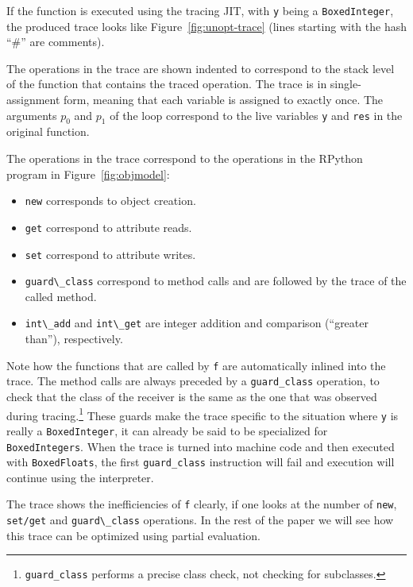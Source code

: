 \documentclass{sigplanconf}
\begin{document}
If the function is executed using the tracing JIT, with \lstinline{y} being a
\lstinline{BoxedInteger}, the produced trace looks like
Figure~\ref{fig:unopt-trace} (lines starting with the hash ``\#'' are comments).

The operations in the trace are shown indented to
correspond to the stack level of the function that contains the traced
operation. The trace is in single-assignment form, meaning that each variable is
assigned to exactly once. The arguments $p_0$ and $p_1$ of the loop correspond
to the live variables \lstinline{y} and \lstinline{res} in the original function.

The operations in the trace correspond to the operations in the RPython program
in Figure~\ref{fig:objmodel}:

\begin{itemize}
    \item \lstinline{new} corresponds to object creation.
    \item \lstinline{get} correspond to attribute reads.
    \item \lstinline{set} correspond to attribute writes.
    \item \lstinline{guard\_class} correspond to method calls and are followed by
    the trace of the called method.
    \item \lstinline{int\_add} and \lstinline{int\_get} are integer addition and
    comparison (``greater than''), respectively.
\end{itemize}

Note how the functions that are called by \lstinline{f} are automatically inlined
into the trace. The method calls are always preceded by a \lstinline{guard_class}
operation, to check that the class of the receiver is the same as the one that
was observed during tracing.\footnote{\lstinline{guard_class} performs a precise
class check, not checking for subclasses.} These guards make the trace specific
to the situation where \lstinline{y} is really a \lstinline{BoxedInteger}, it can
already be said to be specialized for \lstinline{BoxedIntegers}. When the trace is
turned into machine code and then executed with \lstinline{BoxedFloats}, the
first \lstinline{guard_class} instruction will fail and execution will continue
using the interpreter.

The trace shows the inefficiencies of \lstinline{f} clearly, if one looks at the
number of \lstinline{new}, \lstinline{set/get} and \lstinline{guard\_class} operations.
In the rest of the paper we will see how this trace can be optimized using
partial evaluation.
\end{document}
